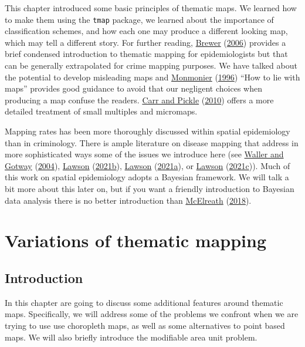 \documentclass[
  krantz2]{krantz}
\begin{document}
This chapter introduced some basic principles of thematic maps. We learned how to make them using the \texttt{tmap} package, we learned about the importance of classification schemes, and how each one may produce a different looking map, which may tell a different story. For further reading, \protect\hyperlink{ref-Brewer_2006}{Brewer} (\protect\hyperlink{ref-Brewer_2006}{2006}) provides a brief condensed introduction to thematic mapping for epidemiologists but that can be generally extrapolated for crime mapping purposes. We have talked about the potential to develop misleading maps and \protect\hyperlink{ref-Monmonier_1996}{Monmonier} (\protect\hyperlink{ref-Monmonier_1996}{1996}) ``How to lie with maps'' provides good guidance to avoid that our negligent choices when producing a map confuse the readers. \protect\hyperlink{ref-Carr_2010}{Carr and Pickle} (\protect\hyperlink{ref-Carr_2010}{2010}) offers a more detailed treatment of small multiples and micromaps.

Mapping rates has been more thoroughly discussed within spatial epidemiology than in criminology. There is ample literature on disease mapping that address in more sophisticated ways some of the issues we introduce here (see \protect\hyperlink{ref-Waller_2004}{Waller and Gotway} (\protect\hyperlink{ref-Waller_2004}{2004}), \protect\hyperlink{ref-Lawson_2006}{Lawson} (\protect\hyperlink{ref-Lawson_2006}{2021b}), \protect\hyperlink{ref-Lawson_2021a}{Lawson} (\protect\hyperlink{ref-Lawson_2021a}{2021a}), or \protect\hyperlink{ref-Lawson_2021b}{Lawson} (\protect\hyperlink{ref-Lawson_2021b}{2021c})). Much of this work on spatial epidemiology adopts a Bayesian framework. We will talk a bit more about this later on, but if you want a friendly introduction to Bayesian data analysis there is no better introduction than \protect\hyperlink{ref-McElreath_2018}{McElreath} (\protect\hyperlink{ref-McElreath_2018}{2018}).

\hypertarget{variations-of-thematic-mapping}{%
\chapter{Variations of thematic mapping}\label{variations-of-thematic-mapping}}

\hypertarget{introduction-3}{%
\section{Introduction}\label{introduction-3}}

In this chapter are going to discuss some additional features around thematic maps. Specifically, we will address some of the problems we confront when we are trying to use use choropleth maps, as well as some alternatives to point based maps. We will also briefly introduce the modifiable area unit problem.
\end{document}
